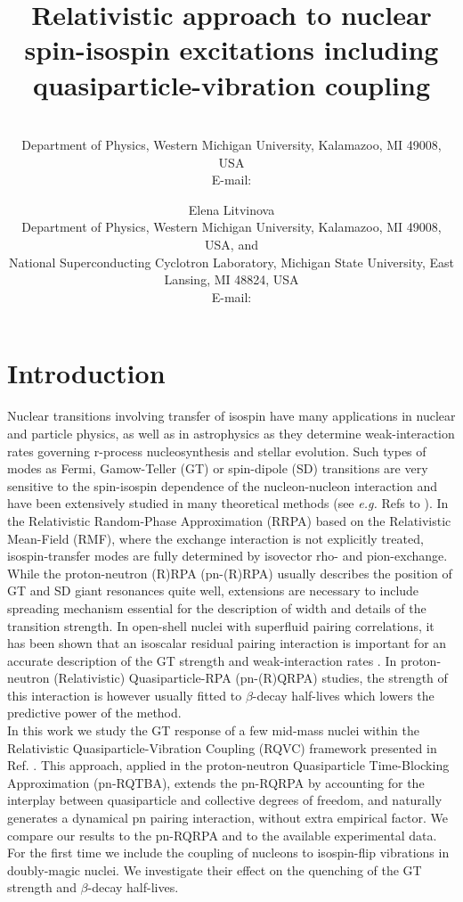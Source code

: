\documentclass{PoS}
\title{Relativistic approach to nuclear spin-isospin excitations including quasiparticle-vibration coupling}
\author{\speaker{Caroline Robin} \\%
        Department of Physics, Western Michigan University, Kalamazoo, MI 49008, USA\\
        E-mail: \email{caroline.robin@wmich.edu}}
\author{Elena Litvinova\\
         Department of Physics, Western Michigan University, Kalamazoo, MI 49008, USA, and\\
         National Superconducting Cyclotron Laboratory, Michigan State University, East Lansing, MI 48824, USA \\
        E-mail: \email{elena.litvinova@wmich.edu}}
\begin{document}
\section{Introduction}
Nuclear transitions involving transfer of isospin have many applications in nuclear and particle physics, as well as in astrophysics as they determine weak-interaction rates governing r-process nucleosynthesis and stellar evolution. 
Such types of modes as Fermi, Gamow-Teller (GT) or spin-dipole (SD) transitions are very sensitive to the spin-isospin dependence of the nucleon-nucleon interaction and have been extensively studied in many theoretical methods (see \textit{e.g.} Refs \cite{Brown} to \cite{Robin}).
In the Relativistic Random-Phase Approximation (RRPA) based on the Relativistic Mean-Field (RMF), where the exchange interaction is not explicitly treated, isospin-transfer modes are fully determined by isovector rho- and pion-exchange. While the proton-neutron (R)RPA (pn-(R)RPA) usually describes the position of GT and SD giant resonances quite well, extensions are necessary to include spreading mechanism essential for the description of width and details of the transition strength.
In open-shell nuclei with superfluid pairing correlations, it has been shown that an isoscalar residual pairing interaction is important for an accurate description of the GT strength and weak-interaction rates \cite{Engel,Mustonen,Bai,Niksic}. In proton-neutron (Relativistic) Quasiparticle-RPA (pn-(R)QRPA) studies, the strength of this interaction is however usually fitted to $\beta$-decay half-lives which lowers the predictive power of the method.\\
In this work we study the GT response of a few mid-mass nuclei within the Relativistic Quasiparticle-Vibration Coupling (RQVC) framework presented in Ref. \cite{Robin}.
This approach, applied in the proton-neutron Quasiparticle Time-Blocking Approximation (pn-RQTBA), extends the pn-RQRPA by accounting for the interplay between quasiparticle and collective degrees of freedom, and naturally generates a dynamical pn pairing interaction, without extra empirical factor.
We compare our results to the pn-RQRPA and to the available experimental data. For the first time we include the coupling of nucleons to isospin-flip vibrations in doubly-magic nuclei. We investigate their effect on the quenching of the GT strength and $\beta$-decay half-lives. 

 
\end{document}
